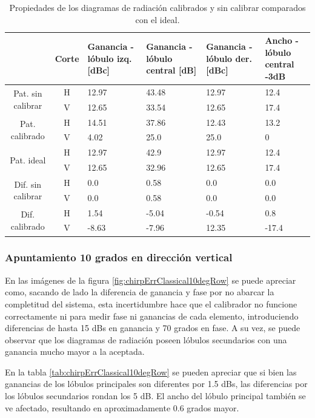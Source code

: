 \begin{table}[H]
  \footnotesize
  \centering
  \begin{tabular}{|c|c|p{2cm}|p{2.5cm}|p{2.5cm}|p{2.5cm}|}
    \cline{2-6}
    \multicolumn{1}{c|}{} & Corte & Ganancia - lóbulo izq. [dBc] & Ganancia - lóbulo central [dB] &
    Ganancia - lóbulo der. [dBc] & Ancho - lóbulo central -3dB \tabularnewline\hline
    \multirow{2}{2cm}{Pat. sin calibrar} & H & 12.97 & 43.48 & 12.97 & 12.4 \tabularnewline\cline{2-6}
     & V & 12.65 & 33.54 & 12.65 & 17.4 \tabularnewline\hline
    \multirow{2}{2cm}{Pat. calibrado} & H & 14.51 & 37.86 & 12.43 & 13.2 \tabularnewline\cline{2-6}
     & V & 4.02 & 25.0 & 25.0 & 0 \tabularnewline\hline
    \multirow{2}{2cm}{Pat. ideal} & H & 12.97 & 42.9 & 12.97 & 12.4 \tabularnewline\cline{2-6}
     & V & 12.65 & 32.96 & 12.65 & 17.4 \tabularnewline\hline
    \multirow{2}{2cm}{Dif. sin calibrar} & H & 0.0 & 0.58 & 0.0 & 0.0\tabularnewline\cline{2-6}
     & V & 0.0 & 0.58 & 0.0 & 0.0 \tabularnewline\hline
    \multirow{2}{2cm}{Dif. calibrado} & H & 1.54 & -5.04 & -0.54 & 0.8 \tabularnewline\cline{2-6}
     & V & -8.63 & -7.96 & 12.35 & -17.4 \tabularnewline\hline
  \end{tabular}
  \caption{Propiedades de los diagramas de radiación calibrados y sin calibrar comparados con el ideal.}
  \label{tab:chirpErrClassical10degCol}
\end{table}


\subsubsection{Apuntamiento 10 grados en dirección vertical}

En las imágenes de la figura \ref{fig:chirpErrClassical10degRow} se puede apreciar como, sacando de lado la diferencia de 
ganancia y fase por no abarcar la completitud del sistema, esta incertidumbre hace que el calibrador no funcione correctamente 
ni para medir fase ni ganancias de cada elemento, introduciendo diferencias de hasta 15 dBs en ganancia y 70 grados en fase. 
A su vez, se puede observar que los diagramas de radiación poseen lóbulos secundarios con una ganancia mucho mayor a la aceptada.

En la tabla \ref{tab:chirpErrClassical10degRow} se pueden apreciar que si bien las ganancias de los lóbulos principales son 
diferentes por 1.5 dBs, las diferencias por los lóbulos secundarios rondan los 5 dB. El ancho del lóbulo principal también 
se ve afectado, resultando en aproximadamente 0.6 grados mayor.

